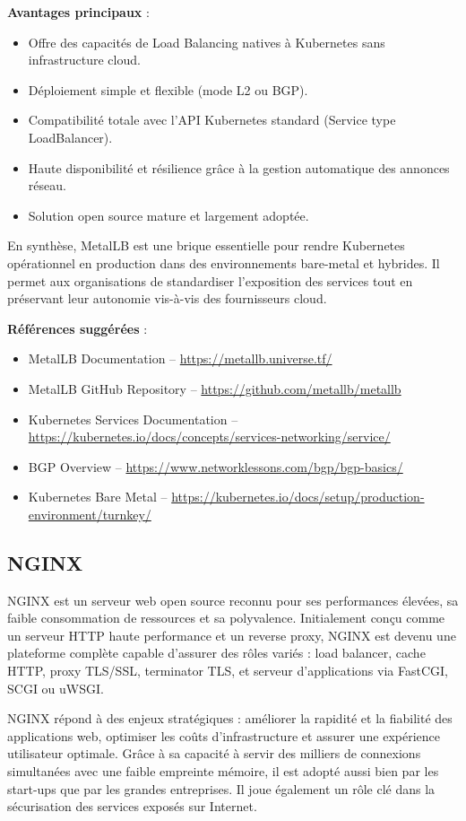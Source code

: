 \textbf{Avantages principaux} :
\begin{itemize}
	\item Offre des capacités de Load Balancing natives à Kubernetes sans infrastructure cloud.
	\item Déploiement simple et flexible (mode L2 ou BGP).
	\item Compatibilité totale avec l’API Kubernetes standard (Service type LoadBalancer).
	\item Haute disponibilité et résilience grâce à la gestion automatique des annonces réseau.
	\item Solution open source mature et largement adoptée.
\end{itemize}

En synthèse, MetalLB est une brique essentielle pour rendre Kubernetes opérationnel en production dans des environnements bare-metal et hybrides. Il permet aux organisations de standardiser l’exposition des services tout en préservant leur autonomie vis-à-vis des fournisseurs cloud.

\textbf{Références suggérées} :
\begin{itemize}
	\item MetalLB Documentation – \url{https://metallb.universe.tf/}
	\item MetalLB GitHub Repository – \url{https://github.com/metallb/metallb}
	\item Kubernetes Services Documentation – \url{https://kubernetes.io/docs/concepts/services-networking/service/}
	\item BGP Overview – \url{https://www.networklessons.com/bgp/bgp-basics/}
	\item Kubernetes Bare Metal – \url{https://kubernetes.io/docs/setup/production-environment/turnkey/}
\end{itemize}

\subsection{NGINX}

NGINX est un serveur web open source reconnu pour ses performances élevées, sa faible consommation de ressources et sa polyvalence. Initialement conçu comme un serveur HTTP haute performance et un reverse proxy, NGINX est devenu une plateforme complète capable d’assurer des rôles variés  : load balancer, cache HTTP, proxy TLS/SSL, terminator TLS, et serveur d’applications via FastCGI, SCGI ou uWSGI.

NGINX répond à des enjeux stratégiques  : améliorer la rapidité et la fiabilité des applications web, optimiser les coûts d’infrastructure et assurer une expérience utilisateur optimale. Grâce à sa capacité à servir des milliers de connexions simultanées avec une faible empreinte mémoire, il est adopté aussi bien par les start-ups que par les grandes entreprises. Il joue également un rôle clé dans la sécurisation des services exposés sur Internet.

